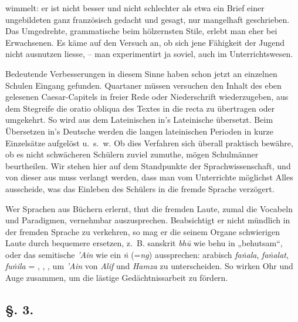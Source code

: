 wimmelt: er ist nicht besser und nicht schlechter als etwa ein Brief einer ungebildeten  ganz französisch gedacht und gesagt, nur mangelhaft geschrieben. Das Umgedrehte, grammatische  beim hölzernsten Stile, erlebt man eher bei Erwachsenen. Es käme auf den Versuch an, ob sich jene Fähigkeit der Jugend nicht ausnutzen liesse, – man experimentirt ja soviel, auch im Unterrichtswesen.

\label{sp.73}

Bedeutende Verbesserungen in diesem Sinne haben schon jetzt an einzelnen Schulen Eingang gefunden. Quartaner müssen versuchen den Inhalt des eben gelesenen Caesar-Capitels in freier Rede oder Niederschrift wiederzugeben, aus dem Stegreife die oratio obliqua des Textes in die recta zu übertragen oder umgekehrt. So wird  aus dem Lateinischen in’s Lateinische übersetzt. Beim Übersetzen in’s Deutsche werden die langen lateinischen Perioden in kurze Einzelsätze aufgelöst u.~s.~w. Ob dies Verfahren sich überall praktisch bewähre, ob es nicht schwächeren Schülern zuviel zumuthe, mögen Schulmänner beurtheilen. Wir stehen hier auf dem Standpunkte der Sprachwissenschaft, und von dieser aus muss verlangt werden, dass man vom Unterrichte möglichst Alles ausscheide, was das Einleben des Schülers in die fremde Sprache verzögert.

Wer Sprachen aus Büchern erlernt, thut  die fremden Laute, zumal die Vocabeln und Paradigmen, vernehmbar auszusprechen. Beabsichtigt er nicht mündlich in der fremden Sprache zu verkehren, so mag \label{fp.75} er die seinem Organe schwierigen Laute durch bequemere ersetzen, z.~B. sanskrit \textit{bhū} wie behu in „behutsam“, oder das semitische \textit{'Ain} wie ein \textit{ṅ} (=\textit{ng}) aussprechen: arabisch \textit{faṅala}, \textit{faṅalat},  \textit{fuṅila} = , ,  , um \textit{'Ain} von \textit{Alif} und \textit{Hamza} zu unterscheiden. So wirken Ohr und Auge zusammen, um die lästige Gedächtnissarbeit zu fördern.

\subsection*{§. 3.}\label{II.IV.3}
